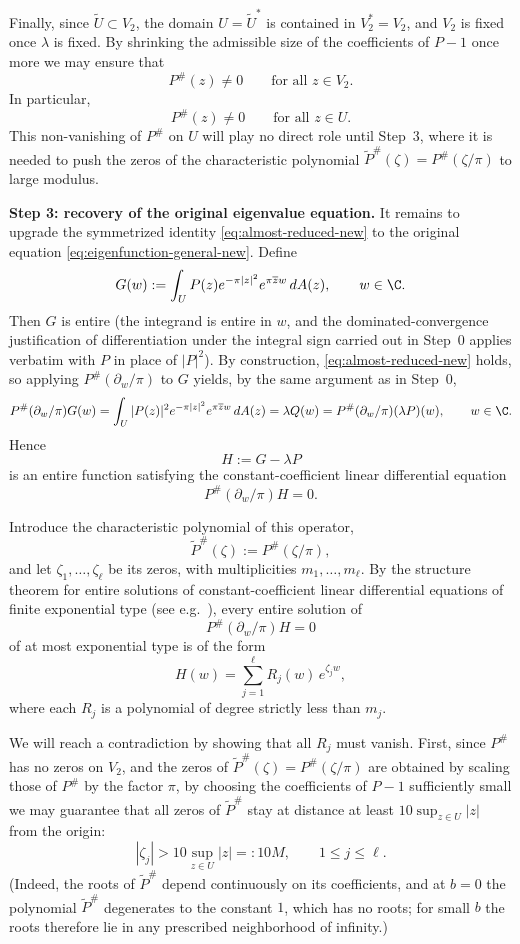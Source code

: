 Finally, since \(\widetilde U\subset V_2\), the domain \(U=\widetilde U^\ast\) is contained in \(V_2^\ast=V_2\), and \(V_2\) is fixed once \(\lambda\) is fixed. By shrinking the admissible size of the coefficients of \(P-1\) once more we may ensure that
\[
P^\#(z)\neq 0
\qquad \text{for all } z\in V_2.
\]
In particular,
\[
P^\#(z)\neq 0
\qquad \text{for all } z\in U.
\]
This non-vanishing of $P^\#$ on $U$ will play no direct role until Step~3, where it is needed to push the zeros of the characteristic polynomial $\widetilde P^\#(\zeta)=P^\#(\zeta/\pi)$ to large modulus.

\medskip
\noindent\textbf{Step 3: recovery of the original eigenvalue equation.}
It remains to upgrade the symmetrized identity \eqref{eq:almost-reduced-new} to the original equation \eqref{eq:eigenfunction-general-new}. Define
\[
G(w):=\int_U P(z)e^{-\pi|z|^2}e^{\pi \overline z w}\,dA(z),
\qquad w\in\C.
\]
Then $G$ is entire (the integrand is entire in $w$, and the dominated-convergence justification of differentiation under the integral sign carried out in Step~0 applies verbatim with $P$ in place of $|P|^2$). By construction, \eqref{eq:almost-reduced-new} holds, so applying $P^\#(\partial_w/\pi)$ to $G$ yields, by the same argument as in Step~0,
\[
P^\#(\partial_w/\pi)G(w)=\int_U|P(z)|^2 e^{-\pi|z|^2}e^{\pi\overline z w}\,dA(z)=\lambda Q(w)=P^\#(\partial_w/\pi)(\lambda P)(w),
\qquad w\in \C.
\]
Hence
\[
H:=G-\lambda P
\]
is an entire function satisfying the constant-coefficient linear differential equation
\[
P^\#(\partial_w/\pi)H=0.
\]

Introduce the characteristic polynomial of this operator,
\[
\widetilde P^\#(\zeta):=P^\#(\zeta/\pi),
\]
and let $\zeta_1,\dots,\zeta_\ell$ be its zeros, with multiplicities $m_1,\dots,m_\ell$. By the structure theorem for entire solutions of constant-coefficient linear differential equations of finite exponential type (see e.g.\ \cite[Ch.\ XII]{Hormander}), every entire solution of
\[
P^\#(\partial_w/\pi)H=0
\]
of at most exponential type is of the form
\begin{equation}\label{eq:exp-decomposition-step3}
H(w)=\sum_{j=1}^\ell R_j(w)\,e^{\zeta_j w},
\end{equation}
where each $R_j$ is a polynomial of degree strictly less than $m_j$.

We will reach a contradiction by showing that all $R_j$ must vanish. First, since $P^\#$ has no zeros on $V_2$, and the zeros of $\widetilde P^\#(\zeta)=P^\#(\zeta/\pi)$ are obtained by scaling those of $P^\#$ by the factor $\pi$, by choosing the coefficients of $P-1$ sufficiently small we may guarantee that all zeros of $\widetilde P^\#$ stay at distance at least $10\sup_{z\in U}|z|$ from the origin:
\[
|\zeta_j|>10\sup_{z\in U}|z|=:10M,
\qquad 1\le j\le \ell.
\]
(Indeed, the roots of $\widetilde P^\#$ depend continuously on its coefficients, and at $b=0$ the polynomial $\widetilde P^\#$ degenerates to the constant $1$, which has no roots; for small $b$ the roots therefore lie in any prescribed neighborhood of infinity.)

